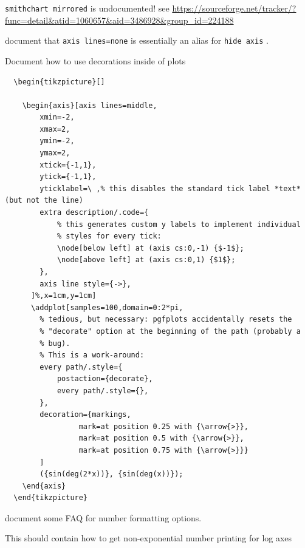 \documentclass[a4paper]{article}
\begin{document}
\begin{bugtracker}
\begin{doctodo}
\end{doctodo}

\begin{doctodo}[+]
	\verb|smithchart mirrored| is undocumented! see \url{https://sourceforge.net/tracker/?func=detail&atid=1060657&aid=3486928&group_id=224188}
\end{doctodo}

\begin{doctodo}[+]
	document that \verb|axis lines=none| is essentially an alias for \verb|hide axis| .
\end{doctodo}

\begin{doctodo}[+]
	Document how to use decorations inside of plots
\begin{verbatim}
  \begin{tikzpicture}[]

    \begin{axis}[axis lines=middle,
        xmin=-2,
        xmax=2,
        ymin=-2,
        ymax=2,
        xtick={-1,1},
        ytick={-1,1},
        yticklabel=\ ,% this disables the standard tick label *text* (but not the line)
        extra description/.code={
            % this generates custom y labels to implement individual
            % styles for every tick:
            \node[below left] at (axis cs:0,-1) {$-1$};
            \node[above left] at (axis cs:0,1) {$1$};
        },
        axis line style={->},
      ]%,x=1cm,y=1cm]
      \addplot[samples=100,domain=0:2*pi,
        % tedious, but necessary: pgfplots accidentally resets the
        % "decorate" option at the beginning of the path (probably a
        % bug).
        % This is a work-around:
        every path/.style={
            postaction={decorate},
            every path/.style={},
        },
        decoration={markings,
                 mark=at position 0.25 with {\arrow{>}},
                 mark=at position 0.5 with {\arrow{>}},
                 mark=at position 0.75 with {\arrow{>}}}
        ]
        ({sin(deg(2*x))}, {sin(deg(x))});
    \end{axis}
  \end{tikzpicture} 
\end{verbatim}

\end{doctodo}


\begin{doctodo}
	document some FAQ for number formatting options.

	This should contain how to get non-exponential number printing for log axes
\end{doctodo}


\end{bugtracker}
\end{document}
